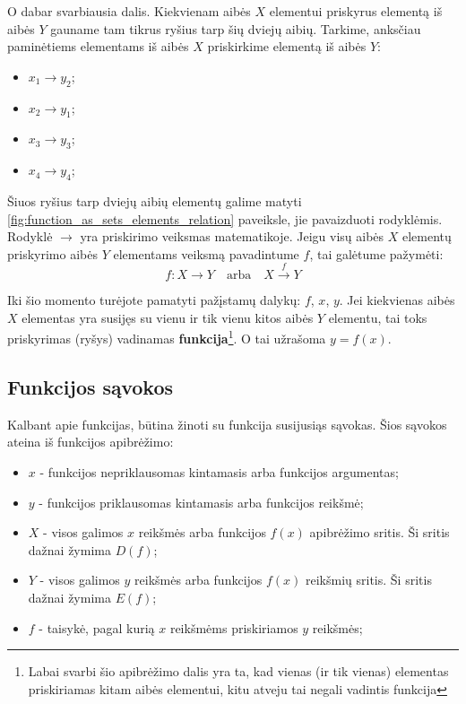 \documentclass[nobib]{tufte-handout}
\begin{document}
O dabar svarbiausia dalis. Kiekvienam aibės $X$ elementui priskyrus elementą iš
aibės $Y$ gauname tam tikrus ryšius tarp šių dviejų aibių. Tarkime, anksčiau
paminėtiems elementams iš aibės $X$ priskirkime elementą iš aibės $Y$:
\begin{itemize}
  \item $x_1 \rightarrow y_2$;
  \item $x_2 \rightarrow y_1$;
  \item $x_3 \rightarrow y_3$;
  \item $x_4 \rightarrow y_4$;
\end{itemize}

Šiuos ryšius tarp dviejų aibių elementų galime matyti
\ref{fig:function_as_sets_elements_relation} paveiksle, jie pavaizduoti
rodyklėmis. Rodyklė $\rightarrow$ yra priskirimo veiksmas matematikoje. Jeigu
visų aibės $X$ elementų priskyrimo aibės $Y$ elementams veiksmą pavadintume
$f$, tai galėtume
pažymėti:
$$ f: X \rightarrow Y  \quad\text{arba}\quad  X \xrightarrow{f} Y$$

Iki šio momento turėjote pamatyti pažįstamų dalykų: $f$, $x$, $y$. Jei
kiekvienas aibės $X$ elementas yra susijęs su vienu ir tik vienu kitos aibės
$Y$ elementu, tai toks priskyrimas (ryšys) vadinamas
\textbf{funkcija}\footnote{Labai
  svarbi šio apibrėžimo dalis yra ta, kad vienas (ir tik vienas) elementas
  priskiriamas kitam aibės elementui, kitu atveju tai negali vadintis
  funkcija}. O tai užrašoma $y=f(x)$.

\subsection{Funkcijos sąvokos}\label{sec:function_related_defintions}

Kalbant apie funkcijas, būtina žinoti su funkcija susijusiąs sąvokas. Šios
sąvokos ateina iš funkcijos apibrėžimo:

\begin{itemize}
  \item $x$ - funkcijos nepriklausomas kintamasis arba funkcijos argumentas;
  \item $y$ - funkcijos priklausomas kintamasis arba funkcijos reikšmė;
  \item $X$ - visos galimos $x$ reikšmės arba funkcijos $f(x)$ apibrėžimo
        sritis. Ši sritis dažnai žymima $D(f)$;
  \item $Y$ - visos galimos $y$ reikšmės arba funkcijos $f(x)$ reikšmių sritis.
        Ši sritis dažnai žymima $E(f)$;
  \item $f$ - taisykė, pagal kurią $x$ reikšmėms priskiriamos $y$ reikšmės;
\end{itemize}
\end{document}
